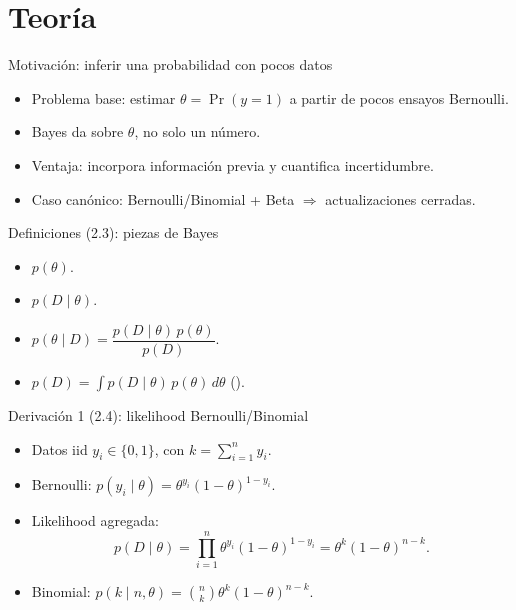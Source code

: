 \section[Teoría]{Teoría\label{sec:teoria}}

\begin{frame}{Motivación: inferir una probabilidad con pocos datos}
\begin{itemize}
  \item Problema base: estimar \(\theta=\Pr(y=1)\) a partir de pocos ensayos Bernoulli.
  \item Bayes da  sobre \(\theta\), no solo un número.
  \item Ventaja: incorpora información previa y cuantifica incertidumbre.
  \item Caso canónico: Bernoulli/Binomial + Beta \(\Rightarrow\) actualizaciones cerradas.
\end{itemize}
\end{frame}

\begin{frame}{Definiciones (2.3): piezas de Bayes}
\begin{itemize}
  \item {} \(p(\theta)\).
  \item {} \(p(D\mid\theta)\).
  \item {} \(p(\theta\mid D)=\dfrac{p(D\mid\theta)\,p(\theta)}{p(D)}\).
  \item {} \(p(D)=\int p(D\mid\theta)\,p(\theta)\,d\theta\) ().
\end{itemize}
\end{frame}

\begin{frame}{Derivación 1 (2.4): likelihood Bernoulli/Binomial}
\begin{itemize}
  \item Datos iid \(y_i\in\{0,1\}\), con \(k=\sum_{i=1}^n y_i\).
  \item Bernoulli: \(p(y_i\mid\theta)=\theta^{y_i}(1-\theta)^{1-y_i}\).
  \item Likelihood agregada:
  \[
    p(D\mid\theta)=\prod_{i=1}^n \theta^{y_i}(1-\theta)^{1-y_i}
    =\theta^{k}(1-\theta)^{n-k}.
  \]
  \item Binomial: \(p(k\mid n,\theta)=\binom{n}{k}\theta^{k}(1-\theta)^{n-k}\).
\end{itemize}
\end{frame}

